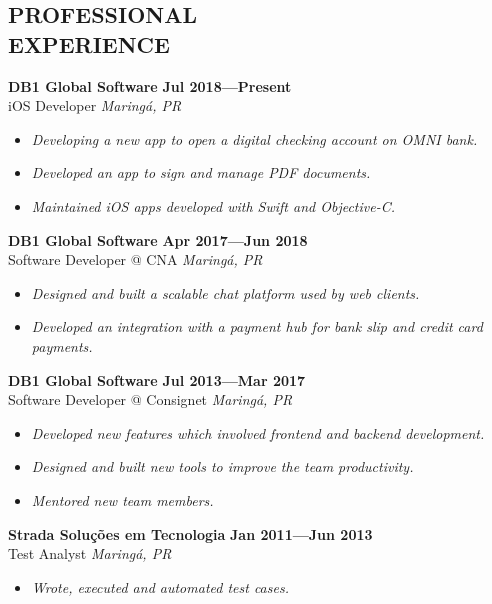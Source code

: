 \documentclass[line,margin]{res}
\begin{document}


\address{\sl marcosatanaka.com --- marcosatanaka@gmail.com --- (44) xxxxx - xxxx}


\begin{resume}


\section{PROFESSIONAL \\ EXPERIENCE}
  {\bf DB1 Global Software} \hfill {\bf Jul 2018---Present} \\
  iOS Developer \hfill {\sl Maring\'a, PR}\\[-6pt]
  \begin{itemize}
    \item {\sl Developing a new app to open a digital checking account on OMNI bank.}
    \item {\sl Developed an app to sign and manage PDF documents.}
    \item {\sl Maintained iOS apps developed with Swift and Objective-C.}
  \end{itemize}

  {\bf DB1 Global Software} \hfill {\bf Apr 2017---Jun 2018} \\
  Software Developer @ CNA \hfill {\sl Maring\'a, PR}\\[-6pt]
  \begin{itemize}
    \item {\sl Designed and built a scalable chat platform used by web clients.}
    \item {\sl Developed an integration with a payment hub for
               bank slip and credit card payments.}
  \end{itemize}

  {\bf DB1 Global Software} \hfill {\bf Jul 2013---Mar 2017} \\
  Software Developer @ Consignet \hfill {\sl Maring\'a, PR}\\[-6pt]
  \begin{itemize}
    \item {\sl Developed new features which involved
               frontend and backend development.}
    \item {\sl Designed and built new tools to improve the team productivity.}
    \item {\sl Mentored new team members.}
  \end{itemize}

  {\bf Strada Solu\c{c}\~oes em Tecnologia} \hfill {\bf Jan 2011---Jun 2013} \\
  Test Analyst \hfill {\sl Maring\'a, PR}\\[-6pt]
    \begin{itemize}
    \item {\sl Wrote, executed and automated test cases.}
  \end{itemize}



\end{resume}
\end{document}
